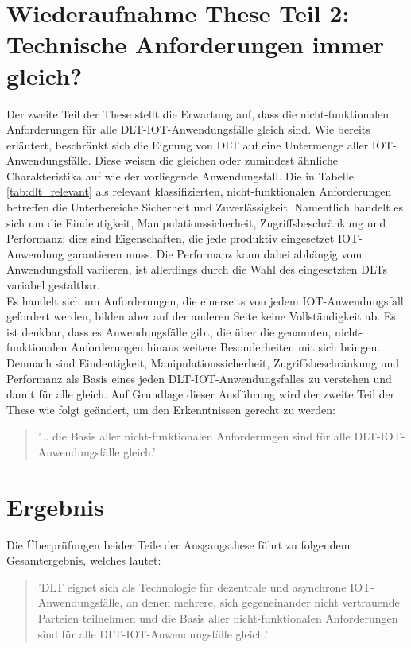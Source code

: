 \section{Wiederaufnahme These Teil 2: Technische Anforderungen immer gleich?}
\label{sec:discussion:part2}
Der zweite Teil der These stellt die Erwartung auf, dass die nicht-funktionalen Anforderungen für alle \ac{DLT}-\ac{IOT}-Anwendungsfälle gleich sind. Wie bereits erläutert, beschränkt sich die Eignung von \ac{DLT} auf eine Untermenge aller \ac{IOT}-Anwendungsfälle. Diese weisen die gleichen oder zumindest ähnliche Charakteristika auf wie der vorliegende Anwendungsfall. Die in Tabelle \ref{tab:dlt_relevant} als relevant klassifizierten, nicht-funktionalen Anforderungen betreffen die Unterbereiche Sicherheit und Zuverlässigkeit. Namentlich handelt es sich um die Eindeutigkeit, Manipulationssicherheit, Zugriffsbeschränkung und Performanz; dies sind Eigenschaften, die jede produktiv eingesetzet \ac{IOT}-Anwendung garantieren muss. Die Performanz kann dabei abhängig vom Anwendungsfall variieren, ist allerdings durch die Wahl des eingesetzten \ac{DLT}s variabel gestaltbar.\\
Es handelt sich um Anforderungen, die einerseits von jedem \ac{IOT}-Anwendungsfall gefordert werden, bilden aber auf der anderen Seite keine Vollständigkeit ab. Es ist denkbar, dass es Anwendungsfälle gibt, die über die genannten, nicht-funktionalen Anforderungen hinaus weitere Besonderheiten mit sich bringen. Demnach sind Eindeutigkeit, Manipulationssicherheit, Zugriffsbeschränkung und Performanz als Basis eines jeden \ac{DLT}-\ac{IOT}-Anwendungsfalles zu verstehen und damit für alle gleich. Auf Grundlage dieser Ausführung wird der zweite Teil der These wie folgt geändert, um den Erkenntnissen gerecht zu werden:
\begin{quote}
  '... die Basis aller nicht-funktionalen Anforderungen sind für alle \ac{DLT}-\ac{IOT}-Anwendungsfälle gleich.'
\end{quote}


\section{Ergebnis}
\label{sec:discussion:result}
Die Überprüfungen beider Teile der Ausgangsthese führt zu folgendem Gesamtergebnis, welches lautet:
\begin{quote}
  '\ac{DLT} eignet sich als Technologie für dezentrale und asynchrone \ac{IOT}-Anwendungsfälle, an denen mehrere, sich gegeneinander nicht vertrauende Parteien teilnehmen und die Basis aller nicht-funktionalen Anforderungen sind für alle \ac{DLT}-\ac{IOT}-Anwendungsfälle gleich.'
\end{quote}

